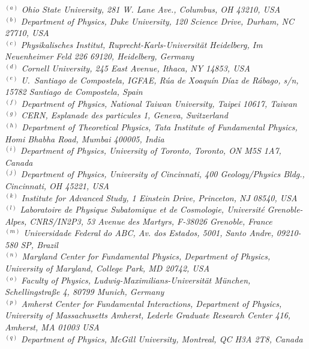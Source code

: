 {\footnotesize
\begin{center}
$^{(a)}$ \emph{Ohio State University, 281 W. Lane Ave., Columbus, OH 43210, USA}\\
$^{(b)}$ \emph{Department of Physics, Duke University, 120 Science Drive, Durham, NC 27710, USA}\\
$^{(c)}$ \emph{Physikalisches Institut, Ruprecht-Karls-Universit\"at Heidelberg, Im Neuenheimer Feld 226 69120, Heidelberg, Germany}\\
$^{(d)}$ \emph{Cornell University, 245 East Avenue, Ithaca, NY 14853, USA}\\
$^{(e)}$ \emph{U.~Santiago de Compostela, IGFAE, R\'ua de Xoaqu\'in D\'iaz de R\'abago, s/n, 15782 Santiago de Compostela, Spain}\\
$^{(f)}$ \emph{Department of Physics, National Taiwan University, Taipei 10617, Taiwan}\\
$^{(g)}$ \emph{CERN, Esplanade des particules 1, Geneva,  Switzerland}\\
$^{(h)}$ \emph{Department of Theoretical Physics, Tata Institute of Fundamental Physics,  Homi Bhabha Road, Mumbai 400005, India}\\
$^{(i)}$ \emph{Department of Physics, University of Toronto, Toronto, ON M5S 1A7, Canada}\\
$^{(j)}$ \emph{Department of Physics, University of Cincinnati, 400 Geology/Physics Bldg., Cincinnati, OH 45221, USA}\\
$^{(k)}$ \emph{Institute for Advanced Study, 1 Einstein Drive, Princeton, NJ 08540, USA}\\
$^{(l)}$ \emph{Laboratoire de Physique Subatomique et de Cosmologie, Universit\'e   Grenoble-Alpes, CNRS/IN2P3, 53 Avenue des Martyrs, F-38026 Grenoble, France}\\
$^{(m)}$ \emph{Universidade Federal do ABC, Av. dos Estados, 5001, Santo Andre, 09210-580 SP, Brazil}\\
$^{(n)}$ \emph{Maryland Center for Fundamental Physics,  Department of Physics, University of Maryland, College Park, MD 20742, USA}\\
$^{(o)}$ \emph{Faculty of Physics, Ludwig-Maximilians-Universit\"at M\"unchen, Schellingstra\ss e 4, 80799 Munich, Germany}\\
$^{(p)}$ \emph{Amherst Center for Fundamental Interactions, Department of Physics, University of Massachusetts Amherst, Lederle Graduate Research Center 416, Amherst, MA 01003 USA}\\
$^{(q)}$ \emph{Department of Physics, McGill University, Montreal, QC H3A 2T8, Canada}\\

\end{center}}
